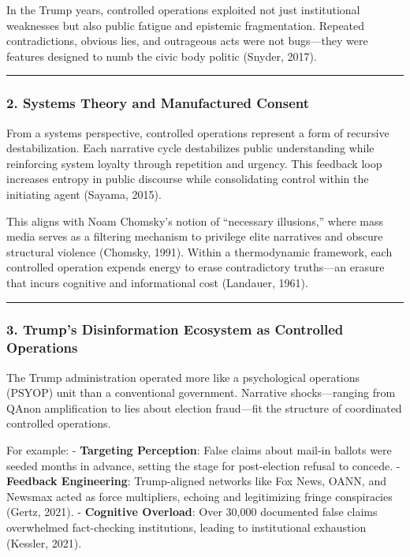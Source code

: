 \documentclass[
]{article}
\begin{document}
In the Trump years, controlled operations exploited not just institutional weaknesses but also public fatigue and epistemic fragmentation. Repeated contradictions, obvious lies, and outrageous acts were not bugs---they were features designed to numb the civic body politic (Snyder, 2017).

\begin{center}\rule{0.5\linewidth}{0.5pt}\end{center}

\subsubsection{2. Systems Theory and Manufactured Consent}\label{systems-theory-and-manufactured-consent}

From a systems perspective, controlled operations represent a form of recursive destabilization. Each narrative cycle destabilizes public understanding while reinforcing system loyalty through repetition and urgency. This feedback loop increases entropy in public discourse while consolidating control within the initiating agent (Sayama, 2015).

This aligns with Noam Chomsky's notion of ``necessary illusions,'' where mass media serves as a filtering mechanism to privilege elite narratives and obscure structural violence (Chomsky, 1991). Within a thermodynamic framework, each controlled operation expends energy to erase contradictory truths---an erasure that incurs cognitive and informational cost (Landauer, 1961).

\begin{center}\rule{0.5\linewidth}{0.5pt}\end{center}

\subsubsection{3. Trump's Disinformation Ecosystem as Controlled Operations}\label{trumps-disinformation-ecosystem-as-controlled-operations}

The Trump administration operated more like a psychological operations (PSYOP) unit than a conventional government. Narrative shocks---ranging from QAnon amplification to lies about election fraud---fit the structure of coordinated controlled operations.

For example:
- \textbf{Targeting Perception}: False claims about mail-in ballots were seeded months in advance, setting the stage for post-election refusal to concede.
- \textbf{Feedback Engineering}: Trump-aligned networks like Fox News, OANN, and Newsmax acted as force multipliers, echoing and legitimizing fringe conspiracies (Gertz, 2021).
- \textbf{Cognitive Overload}: Over 30,000 documented false claims overwhelmed fact-checking institutions, leading to institutional exhaustion (Kessler, 2021).
\end{document}
